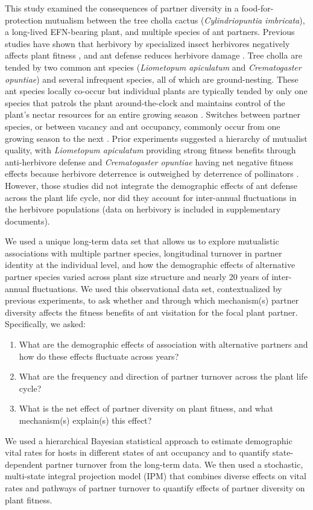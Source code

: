 \documentclass[11pt]{article}
\begin{document}
	This study examined the consequences of partner diversity in a food-for-protection mutualism between the tree cholla cactus (\textit{Cylindriopuntia imbricata}), a long-lived EFN-bearing plant, and multiple species of ant partners.
	Previous studies have shown that herbivory by specialized insect herbivores negatively affects plant fitness \cite{Miller2009}, and ant defense reduces herbivore damage \cite{Miller2007}. 
	Tree cholla are tended by two common ant species (\textit{Liometopum apiculatum} and \textit{Crematogaster opuntiae}) and several infrequent species, all of which are ground-nesting. 
	These ant species locally co-occur but individual plants are typically tended by only one species that patrols the plant around-the-clock and maintains control of the plant's nectar resources for an entire growing season \citep{Ohm2014, Donald2022}. 
	Switches between partner species, or between vacancy and ant occupancy, commonly occur from one growing season to the next \citep{Miller2007}. 
	Prior experiments suggested a hierarchy of mutualist quality, with \textit{Liometopum apiculatum} providing strong fitness benefits through anti-herbivore defense and \textit{Crematogaster opuntiae} having net negative fitness effects because herbivore deterrence is outweighed by deterrence of pollinators \citep{Miller2007,Ohm2014}. 
	However, those studies did not integrate the demographic effects of ant defense across the plant life cycle, nor did they account for inter-annual fluctuations in the herbivore populations (data on herbivory is included in supplementary documents).
	
	We used a unique long-term data set that allows us to explore mutualistic associations with multiple partner species, longitudinal turnover in partner identity at the individual level, and how the demographic effects of alternative partner species varied across plant size structure and nearly 20 years of inter-annual fluctuations. 
	We used this observational data set, contextualized by previous experiments, to ask whether and through which mechanism(s) partner diversity affects the fitness benefits of ant visitation for the focal plant partner. 
	Specifically, we asked:
	\begin{enumerate}	
		\item{What are the demographic effects of association with alternative partners and how do these effects fluctuate across years?}
		\item{What are the frequency and direction of partner turnover across the plant life cycle?}	
		\item{What is the net effect of partner diversity on plant fitness, and what mechanism(s) explain(s) this effect?}
	\end{enumerate}
	We used a hierarchical Bayesian statistical approach to estimate demographic vital rates for hosts in different states of ant occupancy and to quantify state-dependent partner turnover from the long-term data. 
	We then used a stochastic, multi-state integral projection model (IPM) that combines diverse effects on vital rates and pathways of partner turnover to quantify effects of partner diversity on plant fitness. 
	
\end{document}
